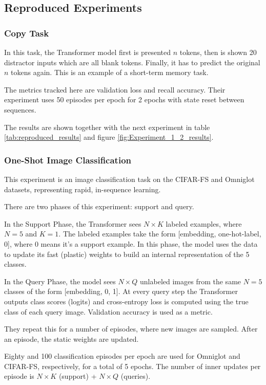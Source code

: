 \documentclass{article}
\begin{document}
\subsection{Reproduced Experiments}

\subsubsection{Copy Task}

\noindent
In this task, the Transformer model first is presented $n$ tokens, then is shown 20 distractor inputs which are all blank tokens. Finally, it has to predict the original $n$ tokens again. This is an example of a short-term memory task. 

The metrics tracked here are validation loss and recall accuracy. Their experiment uses 50 episodes per epoch for 2 epochs with state reset between sequences. 

The results are shown together with the next experiment in table \ref{tab:reproduced_results} and figure \ref{fig:Experiment_1_2_results}. 

\subsubsection{One-Shot Image Classification}

\noindent
This experiment is an image classification task on the CIFAR-FS and Omniglot datasets, representing rapid, in-sequence learning. 

There are two phases of this experiment: support and query. 

In the Support Phase, the Transformer sees $N \times K$ labeled examples, where $N = 5$ and $K = 1$. The labeled examples take the form [embedding, one-hot-label, 0], where 0 means it’s a support example. In this phase, the model uses the data to update its fast (plastic) weights to build an internal representation of the 5 classes.

In the Query Phase, the model sees $N \times Q$ unlabeled images from the same $N=5$ classes of the form [embedding, 0, 1]. At every query step the Transformer outputs class scores (logits) and cross-entropy loss is computed using the true class of each query image. Validation accuracy is used as a metric. 

They repeat this for a number of episodes, where new images are sampled. After an episode, the static weights are updated.

Eighty and 100 classification episodes per epoch are used for Omniglot and CIFAR-FS, respectively, for a total of 5 epochs. The number of inner updates per episode is $N \times K$ (support) + $N \times Q$ (queries).
\end{document}
